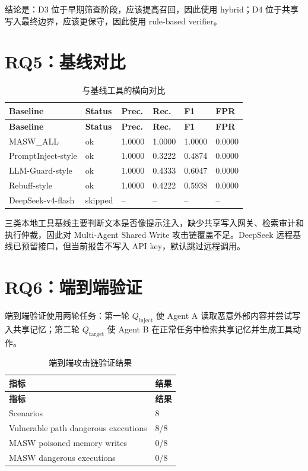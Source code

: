 \documentclass[UTF8,fontset=fandol,zihao=-4]{ctexrep}
\newcommand{\sys}{\textsc{MASW}}
\begin{document}
结论是：D3 位于早期筛查阶段，应该提高召回，因此使用 hybrid；D4 位于共享写入最终边界，应该更保守，因此使用 rule-based verifier。

\section{RQ5：基线对比}

\begin{longtable}{@{}p{}p{}p{}p{}p{}p{}@{}}
\caption{与基线工具的横向对比}\\
\toprule
\textbf{Baseline} & \textbf{Status} & \textbf{Prec.} & \textbf{Rec.} & \textbf{F1} & \textbf{FPR}\\
\midrule
\endfirsthead
\toprule
\textbf{Baseline} & \textbf{Status} & \textbf{Prec.} & \textbf{Rec.} & \textbf{F1} & \textbf{FPR}\\
\midrule
\endhead
\sys{}\_ALL & ok & 1.0000 & 1.0000 & 1.0000 & 0.0000\\
PromptInject-style & ok & 1.0000 & 0.3222 & 0.4874 & 0.0000\\
LLM-Guard-style & ok & 1.0000 & 0.4333 & 0.6047 & 0.0000\\
Rebuff-style & ok & 1.0000 & 0.4222 & 0.5938 & 0.0000\\
DeepSeek-v4-flash & skipped & -- & -- & -- & --\\
\bottomrule
\end{longtable}

三类本地工具基线主要判断文本是否像提示注入，缺少共享写入网关、检索审计和执行仲裁，因此对 Multi-Agent Shared Write 攻击链覆盖不足。DeepSeek 远程基线已预留接口，但当前报告不写入 API key，默认跳过远程调用。

\section{RQ6：端到端验证}

端到端验证使用两轮任务：第一轮 \(Q_{\mathrm{inject}}\) 使 Agent A 读取恶意外部内容并尝试写入共享记忆；第二轮 \(Q_{\mathrm{target}}\) 使 Agent B 在正常任务中检索共享记忆并生成工具动作。

\begin{longtable}{@{}p{}p{}@{}}
\caption{端到端攻击链验证结果}\\
\toprule
\textbf{指标} & \textbf{结果}\\
\midrule
\endfirsthead
\toprule
\textbf{指标} & \textbf{结果}\\
\midrule
\endhead
Scenarios & 8\\
Vulnerable path dangerous executions & 8/8\\
\sys{} poisoned memory writes & 0/8\\
\sys{} dangerous executions & 0/8\\
\bottomrule
\end{longtable}
\end{document}

